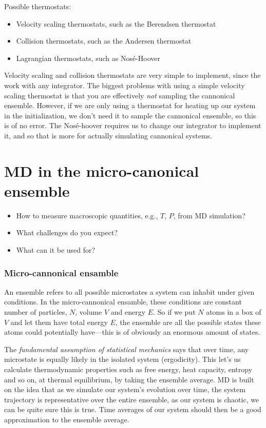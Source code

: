 \documentclass[a4paper, 11pt, notitlepage, english]{article}
\begin{document}
Possible thermostats:
\begin{itemize}
	\item Velocity scaling thermostats, such as the Berendsen thermostat
	\item Collision thermostats, such as the Andersen thermostat
	\item Lagrangian thermostats, such as Nosé-Hoover
\end{itemize}
Velocity scaling and collision thermostats are very simple to implement, since the work with any integrator. The biggest problems with using a simple velocity scaling thermostat is that you are effectively \emph{not} sampling the cannonical ensemble. However, if we are only using a thermostat for heating up our system in the initialization, we don't need it to sample the cannonical ensemble, so this is of no error. The Nosé-hoover requires us to change our integrator to implement it, and so that is more for actually simulating cannonical systems.


\clearpage


\section{MD in the micro-canonical ensemble}
\begin{itemize}
\item How to measure macroscopic quantities, e.g., $T$, $P$, from MD simulation?
\item What challenges do you expect? 
\item What can it be used for?
\end{itemize}

\subsubsection*{Micro-cannonical ensamble}

An ensemble refers to all possible microstates a system can inhabit under given conditions. In the micro-cannonical ensamble, these conditions are constant number of particles, $N$, volume $V$ and energy $E$. So if we put $N$ atoms in a box of $V$ and let them have total energy $E$, the ensemble are all the possible states these atoms could potentially have---this is of obviously an enormous amount of states. 

The \emph{fundamental assumption of statistical mechanics} says that over time, any microstate is equally likely in the isolated system (ergodicity). This let's us calculate thermodynamic properties such as free energy, heat capacity, entropy and so on, at thermal equilibrium, by taking the ensemble average. MD is built on the idea that as we simulate our system's evolution over time, the system trajectory is representative over the entire ensemble, as our system is chaotic, we can be quite sure this is true. Time averages of our system should then be a good approximation to the ensemble average.
\end{document}
